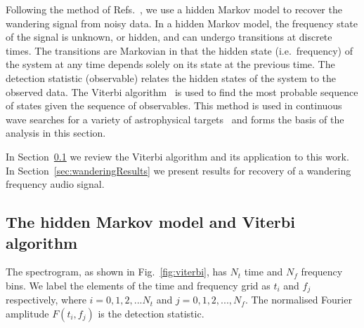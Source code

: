 \documentclass[paper-main.tex]{subfiles}
\begin{document}
Following the method of Refs.~\cite{SuvorovaEtAl:2016,SuvorovaEtAl:2017}, we use a hidden Markov model to recover the wandering signal from noisy data. 
In a hidden Markov model, the frequency state of the signal is unknown, or hidden, and can undergo transitions at discrete times. 
The transitions are Markovian in that the hidden state (i.e.\ frequency) of the system at any time depends solely on its state at the previous time. The detection statistic (observable) relates the hidden states of the system to the observed data.
The Viterbi algorithm~\cite{Viterbi:1967} is used to find the most probable sequence of states given the sequence of observables.
This method is used in continuous wave searches for a variety of astrophysical targets~\cite{ScoX1O2Viterbi:2019, ScoX1ViterbiO1:2017, MillhouseStrangMelatos:2020, JonesSun:2020, MiddletonEtAlO2LMXBs:2020, PostMergerRemnantSearch:2019, SunEtAlSNR:2018, viterbi_application} and forms the basis of the analysis in this section. 
 

In Section~\ref{sec:viterbi} we review the Viterbi algorithm and its application to this work. 
In Section~\ref{sec:wanderingResults} we present results for recovery of a wandering frequency audio signal. 






\subsection{The hidden Markov model and Viterbi algorithm}
\label{sec:viterbi}



The spectrogram, as shown in Fig.~\ref{fig:viterbi}, has $N_t$ time and $N_f$ frequency bins. 
We label the elements of the time and frequency  grid as $t_i$ and $f_j$ respectively, where $i=0,1,2,...N_t$ and $j=0,1,2,...,N_f$. 
The normalised Fourier amplitude $F(t_i,f_j)$ is the detection statistic. 
\end{document}
